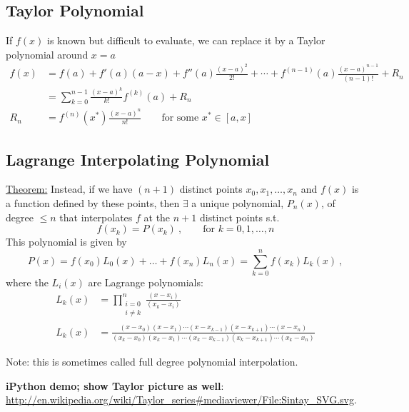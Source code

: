 \documentclass[12pt]{article}
\begin{document}
\subsection*{Taylor Polynomial}
If $f(x)$ is known but difficult to evaluate, we can replace it by a Taylor polynomial around $x = a$
\begin{align}
f(x) &= f(a) + f'(a)(a-x) + f''(a)\frac{(x-a)^2}{2!} + \cdots + f^{(n-1)}(a)\frac{(x-a)^{n-1}}{(n-1)!} + R_n \nonumber \\
%
  &= \sum_{k=0}^{n-1}\frac{(x-a)^k}{k!}f^{(k)}(a) + R_n \nonumber\\
%
R_n &= f^{(n)}(x^*)\frac{(x-a)^{n}}{n!} \qquad \text{for some } x^* \in [a, x]\nonumber
\end{align}


\subsection*{Lagrange Interpolating Polynomial}
%
\underline{Theorem:} 
Instead, if we have $(n+1)$ distinct points $x_0, x_1,\dots, x_n$ and $f(x)$ is a function defined by these points, then $\exists$ a unique polynomial, $P_n(x)$, of degree $\leq n$ that interpolates $f$ at the $n + 1$ distinct points s.t.\
\[f(x_k) = P(x_k)\:, \qquad \text{for }k= 0, 1, \dots, n\]
%
This polynomial is given by
%
\[P(x) = f(x_0)L_0(x) + \dots + f(x_n)L_n(x) = \sum_{k=0}^{n}f(x_k)L_k(x)\:,\]
%
where the $L_i(x)$ are Lagrange polynomials:
%
\begin{align}
L_k(x) &= \prod_{\substack{i=0\\ i \neq k}}^n \frac{(x-x_i)}{(x_k-x_i)}\nonumber\\
%
L_k(x) &= \frac{(x-x_0)(x-x_1)\cdots(x-x_{k-1})(x-x_{k+1})\cdots(x-x_n)}{(x_k-x_0)(x_k-x_1)\cdots(x_k-x_{k-1})(x_k-x_{k+1})\cdots(x_k-x_n)}\nonumber
\end{align}

Note: this is sometimes called full degree polynomial interpolation.

\textbf{iPython demo; show Taylor picture as well}:\\ \href{http://en.wikipedia.org/wiki/Taylor_series#mediaviewer/File:Sintay_SVG.svg}{http://en.wikipedia.org/wiki/Taylor\_series\#mediaviewer/File:Sintay\_SVG.svg}.

\clearpage
\end{document}
